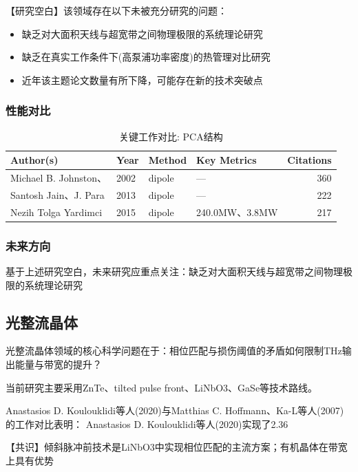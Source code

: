 \documentclass[reprint,amsmath,amssymb,aps,floatfix]{revtex4-2}
\begin{document}
\par\par{【研究空白】该领域存在以下未被充分研究的问题：}
\begin{itemize}
\item 缺乏对大面积天线与超宽带之间物理极限的系统理论研究
\item 缺乏在真实工作条件下(高泵浦功率密度)的热管理对比研究
\item 近年该主题论文数量有所下降，可能存在新的技术突破点
\end{itemize}

\subsubsection*{性能对比}
\begin{table}[h!]
\caption{关键工作对比: PCA结构}
\begin{tabular}{@{}llp{2.5cm}p{2.5cm}r@{}}
\hline
Author(s) & Year & Method & Key Metrics & Citations\\
\hline
Michael B. Johnston、 & 2002 & dipole & --- & 360\\
Santosh Jain、J. Para & 2013 & dipole & --- & 222\\
Nezih Tolga Yardimci & 2015 & dipole & 240.0MW、3.8MW & 217\\
\hline
\end{tabular}
\end{table}

\subsubsection*{未来方向}
基于上述研究空白，未来研究应重点关注：缺乏对大面积天线与超宽带之间物理极限的系统理论研究

\subsection{光整流晶体}
\par\par{光整流晶体领域的核心科学问题在于：相位匹配与损伤阈值的矛盾如何限制THz输出能量与带宽的提升？}

\par\par{当前研究主要采用ZnTe、tilted pulse front、LiNbO3、GaSe等技术路线。}
\par\par{Anastasios D. Koulouklidi等人(2020)与Matthias C. Hoffmann、Ka-L等人(2007)的工作对比表明：}
Anastasios D. Koulouklidi等人(2020)实现了2.36%
\par\par{【共识】倾斜脉冲前技术是LiNbO3中实现相位匹配的主流方案；有机晶体在带宽上具有优势}
\end{document}
